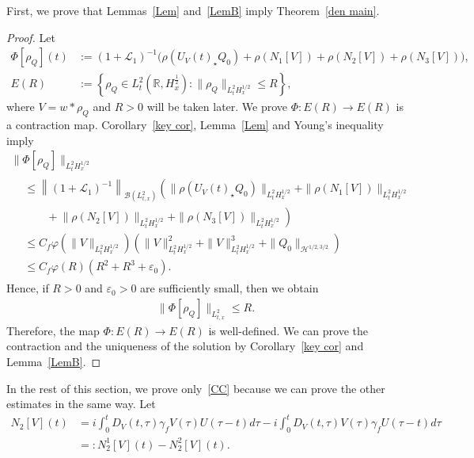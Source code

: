 \documentclass[AHL,Unicode,longabstracts,MathTools,published]{cedram}
\newcommand{\CB}{\mathcal{B}}
\newcommand{\CH}{\mathcal{H}}
\newcommand{\CL}{\mathcal{L}}
\newcommand{\ga}{\gamma}
\newcommand{\ep}{\varepsilon}
\newcommand{\ph}{\varphi}
\newcommand{\ta}{\tau}
\newcommand{\rh}{\rho}
\newcommand{\Ph}{\Phi}
\newcommand{\K}[1]{\left(#1\right)}
\newcommand{\st}{\star}
\newcommand{\R}{\mathbb{R}}
\newcommand{\tw}{\frac{1}{2}}
\begin{document}
First, we prove that Lemmas~\ref{Lem} and~\ref{LemB} imply Theorem~\ref{den main}.
\begin{proof}
Let
\begin{align}
\Ph[\rh_Q](t)&:= (1+\CL_1)^{-1} \big(\rh(U_V(t)_\st Q_0) + \rh(N_1[V])+ \rh(N_2[V])+ \rh(N_3[V])\big), \\
E(R)&:= \left\{\rh_Q \in L^2_t\left(\R,H^\tw_x\right) : \|\rh_Q\|_{L^2_t H^{1/2}_x} \leq R\right\},
\end{align}
where $V = w \ast \rh_Q$ and $R>0$ will be taken later. We prove $\Ph:E(R) \to E(R)$ is a contraction map. Corollary~\ref{key cor}, Lemma~\ref{Lem} and Young's inequality imply
\begin{multline}
\| \Ph[\rh_Q] \|_{L^2_t H^{1/2}_x}\\
\begin{aligned}
&\leq \left\|(1+\CL_1)^{-1}\right\|_{\CB\left(L^2_{t,x}\right)}
\left(\|\rh(U_V(t)_\st Q_0)\|_{L^2_t H^{1/2}_x} + \|\rh(N_1[V])\|_{L^2_t H^{1/2}_x} \right.\\
&\qquad +\left. \|\rh(N_2[V])\|_{L^2_t H^{1/2}_x} + \|\rh(N_3[V])\|_{L^2_t H^{1/2}_x}
\right)\\
& \le C_f \ph\left(\|V\|_{L^2_t H^{1/2}_x}\right)
\K{\|V\|_{L^2_t H^{1/2}_x}^2 + \|V\|_{L^2_t H^{1/2}_x}^3 + \|Q_0\|_{\CH^{1/2,3/2}} } \\
& \le C_f \ph(R)\left(R^2 + R^3 + \ep_0\right).
\end{aligned}
\end{multline}
Hence, if $R >0$ and $\ep_0 >0$ are sufficiently small, then we obtain
\begin{align}
\| \Ph[\rh_Q] \|_{L^2_{t,x}} \leq R.
\end{align}
Therefore, the map $\Ph:E(R) \to E(R)$ is well-defined. We can prove the contraction and the uniqueness of the solution by Corollary~\ref{key cor} and Lemma~\ref{LemB}.
\end{proof}

In the rest of this section, we prove only~\eqref{CC} because we can prove the other estimates in the same way. Let
\begin{equation}\label{C1 C2}
\begin{split}
N_2[V](t) &= i \int_0^t D_V(t,\ta) \ga_f V(\ta) U(\ta-t)d\ta-i\int_0^t D_V(t,\ta) V(\ta) \ga_f U(\ta-t)d\ta \\
&=:N_2^1[V](t) - N_2^2[V](t). 
\end{split}
\end{equation}
\end{document}
